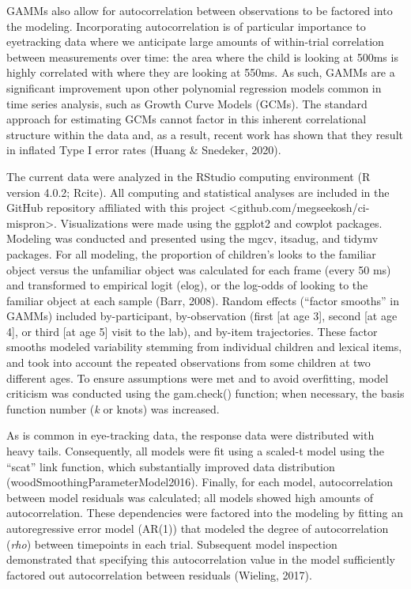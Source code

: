 \documentclass[
]{article}
\begin{document}
GAMMs also allow for autocorrelation between observations to be factored into the modeling. Incorporating autocorrelation is of particular importance to eyetracking data where we anticipate large amounts of within-trial correlation between measurements over time: the area where the child is looking at 500ms is highly correlated with where they are looking at 550ms. As such, GAMMs are a significant improvement upon other polynomial regression models common in time series analysis, such as Growth Curve Models (GCMs). The standard approach for estimating GCMs cannot factor in this inherent correlational structure within the data and, as a result, recent work has shown that they result in inflated Type I error rates (Huang \& Snedeker, 2020).

The current data were analyzed in the RStudio computing environment (R version 4.0.2; Rcite). All computing and statistical analyses are included in the GitHub repository affiliated with this project \textless github.com/megseekosh/ci-mispron\textgreater. Visualizations were made using the ggplot2 and cowplot packages. Modeling was conducted and presented using the mgcv, itsadug, and tidymv packages. For all modeling, the proportion of children's looks to the familiar object versus the unfamiliar object was calculated for each frame (every 50 ms) and transformed to empirical logit (elog), or the log-odds of looking to the familiar object at each sample (Barr, 2008). Random effects (``factor smooths'' in GAMMs) included by-participant, by-observation (first {[}at age 3{]}, second {[}at age 4{]}, or third {[}at age 5{]} visit to the lab), and by-item trajectories. These factor smooths modeled variability stemming from individual children and lexical items, and took into account the repeated observations from some children at two different ages. To ensure assumptions were met and to avoid overfitting, model criticism was conducted using the gam.check() function; when necessary, the basis function number (\emph{k} or knots) was increased.

As is common in eye-tracking data, the response data were distributed with heavy tails. Consequently, all models were fit using a scaled-t model using the ``scat'' link function, which substantially improved data distribution (woodSmoothingParameterModel2016). Finally, for each model, autocorrelation between model residuals was calculated; all models showed high amounts of autocorrelation. These dependencies were factored into the modeling by fitting an autoregressive error model (AR(1)) that modeled the degree of autocorrelation (\emph{rho}) between timepoints in each trial. Subsequent model inspection demonstrated that specifying this autocorrelation value in the model sufficiently factored out autocorrelation between residuals (Wieling, 2017).
\end{document}
